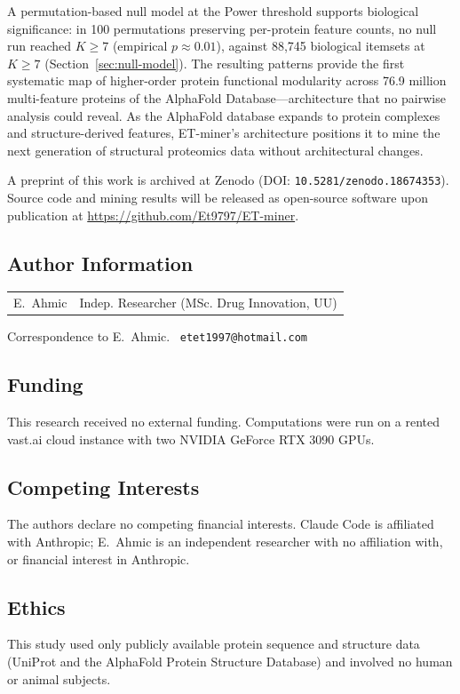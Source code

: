 \documentclass[10pt,a4paper,twocolumn]{article}
\begin{document}
A permutation-based null model at the Power threshold supports biological significance: in 100 permutations preserving per-protein feature counts, no null run reached $K{\geq}7$ (empirical $p{\approx}0.01$), against 88,745 biological itemsets at $K{\geq}7$ (Section~\ref{sec:null-model}). The resulting patterns provide the first systematic map of higher-order protein functional modularity across 76.9 million multi-feature proteins of the AlphaFold Database---architecture that no pairwise analysis could reveal. As the AlphaFold database expands to protein complexes and structure-derived features, ET-miner's architecture positions it to mine the next generation of structural proteomics data without architectural changes.

A preprint of this work is archived at Zenodo (DOI: \texttt{10.5281/zenodo.18674353}). Source code and mining results will be released as open-source software upon publication at \url{https://github.com/Et9797/ET-miner}.

\subsection*{Author Information}
\small
\begin{tabular}{@{}ll@{}}
E.\ Ahmic & Indep. Researcher (MSc. Drug Innovation, UU) \\
\end{tabular}

\smallskip
\noindent Correspondence to E.\ Ahmic. \ \texttt{etet1997@hotmail.com}
\normalsize

\subsection*{Funding}
\small
\noindent This research received no external funding. Computations were run on a rented vast.ai cloud instance with two NVIDIA GeForce RTX 3090 GPUs.
\normalsize

\subsection*{Competing Interests}
\small
\noindent The authors declare no competing financial interests. Claude Code is affiliated with Anthropic; E.\ Ahmic is an independent researcher with no affiliation with, or financial interest in Anthropic.
\normalsize

\subsection*{Ethics}
\small
\noindent This study used only publicly available protein sequence and structure data (UniProt and the AlphaFold Protein Structure Database) and involved no human or animal subjects.
\normalsize
\end{document}
